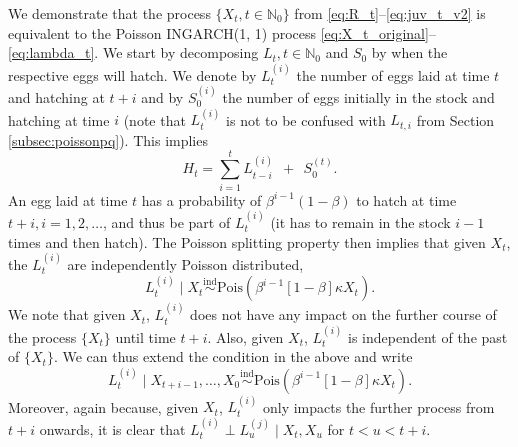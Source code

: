 \documentclass[review]{elsarticle}
\begin{document}
We demonstrate that the process $\{X_t, t \in \mathbb{N}_0\}$ from \eqref{eq:R_t}--\eqref{eq:juv_t_v2} is equivalent to the Poisson INGARCH(1, 1) process \eqref{eq:X_t_original}--\eqref{eq:lambda_t}. We start by decomposing $L_t, t \in \mathbb{N}_0$ and $S_0$ by when the respective eggs will hatch. We denote by $L_t^{(i)}$ the number of eggs laid at time $t$ and hatching at $t + i$ and by $S^{(i)}_0$ the number of eggs initially in the stock and hatching at time $i$ (note that $L_t^{(i)}$ is not to be confused with $L_{t, i}$ from Section \ref{subsec:poissonpq}). This implies
\begin{equation}
H_t = \sum_{i = 1}^{t} L_{t - i}^{(i)} \ \ + \ \ S_0^{(t)}.
\label{eq:sums}
\end{equation}
An egg laid at time $t$ has a probability of $\beta^{i - 1}(1 - \beta)$ to hatch at time $t + i, i = 1, 2, \dots$, and thus be part of $L_t^{(i)}$ (it has to remain in the stock $i - 1$ times and then hatch). The Poisson splitting property \cite{Kingman1993} then implies that given $X_t$, the $L_t^{(i)}$ are independently Poisson distributed,
$$
L_t^{(i)} \mid X_t \stackrel{\text{ind}}{\sim} \text{Pois}(\beta^{i - 1}[1 - \beta]\kappa X_t). %
$$
We note that given $X_t$, $L_t^{(i)}$ does not have any impact on the further course of the process $\{X_t\}$ until time $t + i$. Also, given $X_t$, $L_t^{(i)}$ is independent of the past of $\{X_t\}$. We can thus extend the condition in the above and write
$$
L_t^{(i)} \mid X_{t + i - 1}, \dots, X_0 \stackrel{\text{ind}}{\sim} \text{Pois}(\beta^{i - 1}[1 - \beta]\kappa X_t). %
$$
Moreover, again because, given $X_t$, $L_t^{(i)}$ only impacts the further process from $t + i$ onwards, it is clear that $L_t^{(i)} \perp L_u^{(j)} \mid X_t, X_u$ for $t < u < t + i$.
\end{document}

